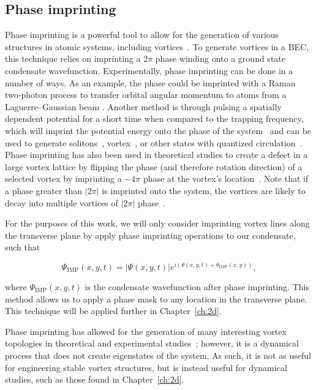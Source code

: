 \subsection{Phase imprinting}

Phase imprinting is a powerful tool to allow for the generation of various structures in atomic systems, including vortices~\cite{kumar2018, moulder2012, burger1999, denschlag2000, wu2002}.
To generate vortices in a BEC, this technique relies on imprinting a $2\pi$ phase winding onto a ground state condensate wavefunction.
Experimentally, phase imprinting can be done in a number of ways.
As an example, the phase could be imprinted with a Raman two-photon process to transfer orbital angular momentum to atoms from a Laguerre--Gaussian beam \cite{moulder2012, ryu2007}.
Another method is through pulsing a spatially dependent potential for a short time when compared to the trapping frequency, which will imprint the potential energy onto the phase of the system~\cite{kasevich1991} and can be used to generate solitons~\cite{denschlag2000}, vortex~\cite{gajda1999}, or other states with quantized circulation~\cite{kumar2018}.
Phase imprinting has also been used in theoretical studies to create a defect in a large vortex lattice by flipping the phase (and therefore rotation direction) of a selected vortex by imprinting a $-4\pi$ phase at the vortex's location~\cite{o2016topo}.
Note that if a phase greater than $|2\pi|$ is imprinted onto the system, the vortices are likely to decay into multiple vortices of $|2\pi|$ phase~\cite{shin2004}.

For the purposes of this work, we will only consider imprinting vortex lines along the transverse plane by apply phase imprinting operations to our condensate, such that

\begin{equation}
\Psi_{\text{IMP}}(x,y,t) = |\Psi(x,y,t)|e^{i(\theta(x,y,t) + \theta_{\text{IMP}}(x,y))},
\end{equation}

\noindent where $\Psi_{\text{IMP}}(x,y,t)$ is the condensate wavefunction after phase imprinting.
This method allows us to apply a phase mask to any location in the transverse plane.
This technique will be applied further in Chapter~\ref{ch:2d}.

Phase imprinting has allowed for the generation of many interesting vortex topologies in theoretical and experimental studies~\cite{white2014, maucher2016}; however, it is a dynamical process that does not create eigenstates of the system.
As such, it is not as useful for engineering stable vortex structures, but is instead useful for dynamical studies, such as those found in Chapter~\ref{ch:2d}.

